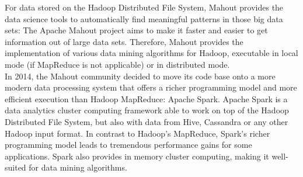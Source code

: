 For data stored on the Hadoop Distributed File System, Mahout provides the data science tools to automatically find meaningful patterns in those big data sets: The Apache Mahout project aims to make it faster and easier to get information out of large data sets.
Therefore, Mahout provides the implementation of various data mining algorithms for Hadoop, executable in local mode (if MapReduce is not applicable) or in distributed mode. 
\\
In 2014, the Mahout community decided to move its code base onto a more modern data processing system that offers a richer programming model and more efficient execution than Hadoop MapReduce: Apache Spark. Apache Spark is a data analytics cluster computing framework able to work on top of the Hadoop Distributed File System, but also with data from Hive, Cassandra or any other Hadoop input format. In contrast to Hadoop’s MapReduce, Spark's richer programming model leads to tremendous performance gains for some applications. Spark also provides in memory cluster computing, making it well-suited for data mining algorithms. 


